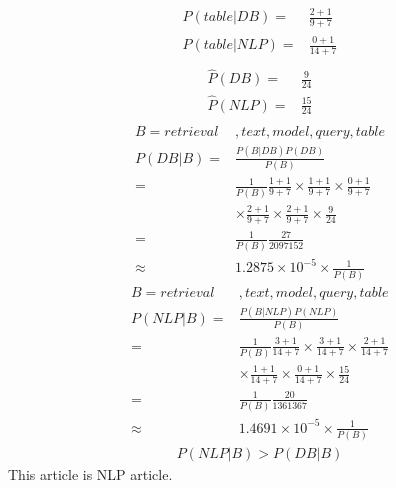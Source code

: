 \documentclass{article}
\begin{document}
    \begin{equation}
        \begin{split}
            \hat{P}(table|DB)=&\frac{2+1}{9+7}\\
            \hat{P}(table|NLP)=&\frac{0+1}{14+7}\\
        \end{split}
    \end{equation}
    \begin{equation}
        \begin{split}
            \hat{P}(DB)=&\frac{9}{24}\\
            \hat{P}(NLP)=&\frac{15}{24}\\
        \end{split}
    \end{equation}
    \begin{equation}
        \begin{split}
            B=retrieval&,text,model,query,table\\
            P(DB|B)=&\frac{P(B|DB)P(DB)}{P(B)}\\
                =&\frac{1}{P(B)}\frac{1+1}{9+7}\times\frac{1+1}{9+7}\times\frac{0+1}{9+7}\\
                &\times \frac{2+1}{9+7}\times\frac{2+1}{9+7}\times \frac{9}{24}\\
                =&\frac{1}{P(B)}\frac{27}{2097152}\\
                \approx&1.2875\times 10^{-5}\times\frac{1}{P(B)}
        \end{split}
    \end{equation}
    \begin{equation}
        \begin{split}
            B=retrieval&,text,model,query,table\\
            P(NLP|B)=&\frac{P(B|NLP)P(NLP)}{P(B)}\\
                =&\frac{1}{P(B)}\frac{3+1}{14+7} \times\frac{3+1}{14+7} \times\frac{2+1}{14+7}\\
                &\times \frac{1+1}{14+7}\times\frac{0+1}{14+7}\times \frac{15}{24}\\
                =&\frac{1}{P(B)}\frac{20}{1361367}\\
                \approx & 1.4691\times 10^{-5}\times\frac{1}{P(B)}
        \end{split}
    \end{equation}
    \begin{equation}
        \begin{split}
            P(NLP|B)>P(DB|B)
        \end{split}
    \end{equation}
    This article is NLP article.
\end{document}
